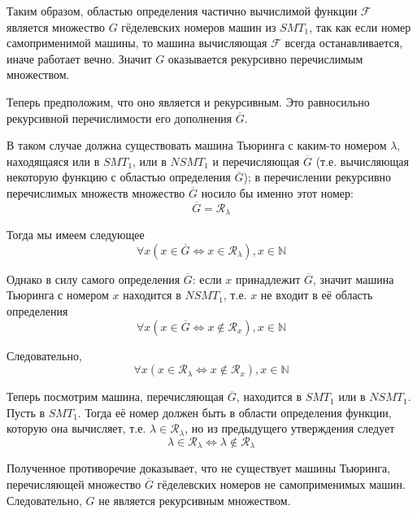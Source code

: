 \documentclass[a4paper, 12pt]{article}  %
\theoremstyle{definition}
\begin{document}
		Таким образом, областью определения частично вычислимой функции $\mathscr{F}$ является множество
		$G$ гёделевских номеров машин из $SMT_1$, так как если номер самоприменимой машины, то машина
		вычисляющая $\mathscr{F}$ всегда останавливается, иначе работает вечно. Значит $G$ оказывается
		рекурсивно перечислимым множеством.
		
		Теперь предположим, что оно является и рекурсивным. Это равносильно рекурсивной перечислимости его
		дополнения $\overline{G}$.
		
		В таком случае должна существовать машина Тьюринга с каким-то номером $\lambda$, находящаяся или в
		$SMT_1$, или в $NSMT_1$ и перечисляющая $\overline{G}$ (т.е. вычисляющая некоторую функцию с
		областью определения $\overline{G}$); в перечислении рекурсивно перечислимых множеств
		множество $\overline{G}$ носило бы именно этот номер:
		$$ \overline{G} = \mathscr{R}_{\lambda} $$
		
		Тогда мы имеем следующее
		$$ \forall x ( x \in \overline{G} \Leftrightarrow  x \in \mathscr{R}_{\lambda} ), x \in \mathbb{N}$$
		
		Однако в силу самого определения $\overline{G}$: если $x$ принадлежит $\overline{G}$, значит машина
		Тьюринга с номером $x$ находится в $NSMT_1$, т.е. $x$ не входит в её область определения
		$$ \forall x (x \in \overline{G} \Leftrightarrow  x \notin \mathscr{R}_x ), x \in \mathbb{N}$$
		
		Следовательно,
		$$ \forall x (x \in \mathscr{R}_{\lambda} \Leftrightarrow  x \notin \mathscr{R}_x), x \in \mathbb{N} $$
		
		Теперь посмотрим машина, перечисляющая $\overline{G}$, находится в $SMT_1$ или в $NSMT_1$. Пусть в
		$SMT_1$. Тогда её номер должен быть в области определения функции, которую она вычисляет, т.е. 
		$\lambda \in \mathscr{R}_{\lambda}$, но из предыдущего утверждения следует 
		$$ \lambda \in \mathscr{R}_{\lambda} \Leftrightarrow  \lambda \notin \mathscr{R}_{\lambda}$$
		
		Полученное противоречие доказывает, что не существует машины Тьюринга, перечисляющей множество
		$\overline{G}$ гёделевских номеров не самоприменимых машин. Следовательно, $G$ не является
		рекурсивным множеством.
\end{document}
